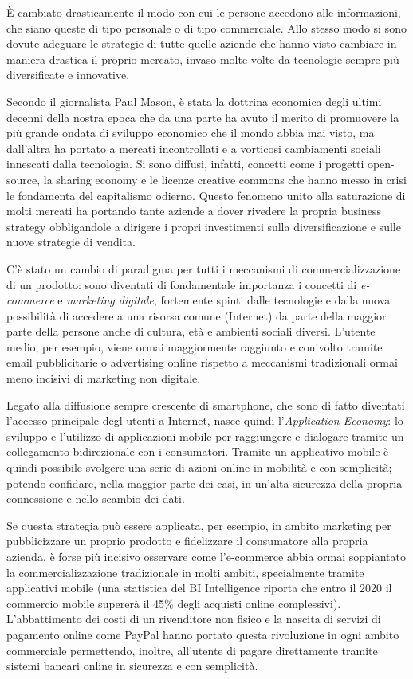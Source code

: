 È cambiato drasticamente il modo con cui le persone accedono alle
informazioni, che siano queste di tipo personale o di tipo commerciale.
Allo stesso modo si sono dovute adeguare le strategie di tutte quelle
aziende che hanno visto cambiare in maniera drastica il proprio mercato,
invaso molte volte da tecnologie sempre più diversificate e innovative.\bigskip{}

Secondo il giornalista Paul Mason, è stata la dottrina economica degli
ultimi decenni della nostra epoca che da una parte ha avuto il merito
di promuovere la più grande ondata di sviluppo economico che il mondo
abbia mai visto, ma dall’altra ha portato a mercati incontrollati
e a vorticosi cambiamenti sociali innescati dalla tecnologia. Si sono
diffusi, infatti, concetti come i progetti open-source, la sharing
economy e le licenze creative commons che hanno messo in crisi le
fondamenta del capitalismo odierno. Questo fenomeno unito alla saturazione
di molti mercati ha portando tante aziende a dover rivedere la propria
business strategy obbligandole a dirigere i propri investimenti sulla
diversificazione e sulle nuove strategie di vendita. \cite{POSTCAPITALISMO}

\bigskip{}

C'è stato un cambio di paradigma per tutti i meccanismi di commercializzazione
di un prodotto: sono diventati di fondamentale importanza i concetti
di \emph{e-commerce} e \emph{marketing digitale}, fortemente spinti
dalle tecnologie e dalla nuova possibilità di accedere a una risorsa
comune (Internet) da parte della maggior parte della persone anche
di cultura, età e ambienti sociali diversi. L'utente medio, per esempio,
viene ormai maggiormente raggiunto e conivolto tramite email pubblicitarie
o advertising online rispetto a meccanismi tradizionali ormai meno
incisivi di marketing non digitale.

\bigskip{}

Legato alla diffusione sempre crescente di smartphone, che sono di
fatto diventati l'accesso principale degl utenti a Internet, nasce
quindi l'\textit{Application Economy}: lo sviluppo e l'utilizzo di
applicazioni mobile per raggiungere e dialogare tramite un collegamento
bidirezionale con i consumatori. Tramite un applicativo mobile è quindi
possibile svolgere una serie di azioni online in mobilità e con semplicità;
potendo confidare, nella maggior parte dei casi, in un'alta sicurezza
della propria connessione e nello scambio dei dati.

Se questa strategia può essere applicata, per esempio, in ambito marketing
per pubblicizzare un proprio prodotto e fidelizzare il consumatore
alla propria azienda, è forse più incisivo osservare come l'e-commerce
abbia ormai soppiantato la commercializzazione tradizionale in molti
ambiti, specialmente tramite applicativi mobile (una statistica del
BI Intelligence riporta che entro il 2020 il commercio mobile supererà
il 45\% degli acquisti online complessivi). L'abbattimento dei costi
di un rivenditore non fisico e la nascita di servizi di pagamento
online come PayPal hanno portato questa rivoluzione in ogni ambito
commerciale permettendo, inoltre, all'utente di pagare direttamente
tramite sistemi bancari online in sicurezza e con semplicità.\bigskip{}

